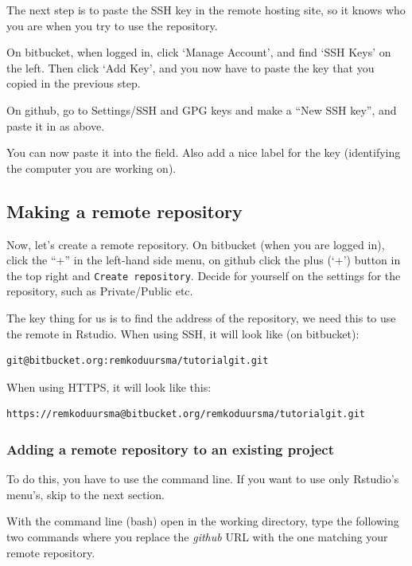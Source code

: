 \documentclass[]{book}
\begin{document}
The next step is to paste the SSH key in the remote hosting site, so it knows who you are when you try to use the repository.

On bitbucket, when logged in, click `Manage Account', and find `SSH Keys' on the left. Then click `Add Key', and you now have to paste the key that you copied in the previous step.

On github, go to Settings/SSH and GPG keys and make a ``New SSH key'', and paste it in as above.

You can now paste it into the field. Also add a nice label for the key (identifying the computer you are working on).

\hypertarget{makeremotegit}{%
\subsection{Making a remote repository}\label{makeremotegit}}

Now, let's create a remote repository. On bitbucket (when you are logged in), click the ``+'' in the left-hand side menu, on github click the plus (`+') button in the top right and \texttt{Create\ repository}. Decide for yourself on the settings for the repository, such as Private/Public etc.

The key thing for us is to find the address of the repository, we need this to use the remote in Rstudio. When using SSH, it will look like (on bitbucket):

\begin{verbatim}
git@bitbucket.org:remkoduursma/tutorialgit.git
\end{verbatim}

When using HTTPS, it will look like this:

\begin{verbatim}
https://remkoduursma@bitbucket.org/remkoduursma/tutorialgit.git
\end{verbatim}

\hypertarget{adding-a-remote-repository-to-an-existing-project}{%
\subsubsection{Adding a remote repository to an existing project}\label{adding-a-remote-repository-to-an-existing-project}}

To do this, you have to use the command line. If you want to use only Rstudio's menu's, skip to the next section.

With the command line (bash) open in the working directory, type the following two commands where you replace the \emph{github} URL with the one matching your remote repository.
\end{document}
